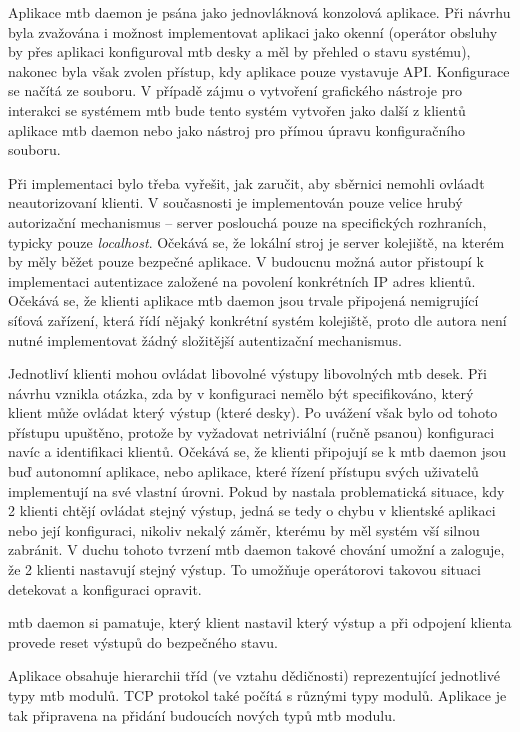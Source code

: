 Aplikace \gls{mtb} daemon je psána jako jednovláknová konzolová aplikace.
Při návrhu byla zvažována i možnost implementovat aplikaci jako okenní
(operátor obsluhy by přes aplikaci konfiguroval \gls{mtb} desky a měl by
přehled o stavu systému), nakonec byla však zvolen přístup, kdy aplikace pouze
vystavuje API. Konfigurace se načítá ze souboru. V případě zájmu o vytvoření
grafického nástroje pro interakci se systémem \gls{mtb} bude tento systém
vytvořen jako další z klientů aplikace \gls{mtb} daemon nebo jako nástroj pro
přímou úpravu konfiguračního souboru.

Při implementaci bylo třeba vyřešit, jak zaručit, aby sběrnici nemohli ovláadt
neautorizovaní klienti. V současnosti je implementován pouze velice hrubý
autorizační mechanismus – server poslouchá pouze na specifických rozhraních,
typicky pouze \textit{localhost}. Očekává se, že lokální stroj je server
kolejiště, na kterém by měly běžet pouze bezpečné aplikace. V budoucnu možná
autor přistoupí k implementaci autentizace založené na povolení konkrétních
IP adres klientů. Očekává se, že klienti aplikace \gls{mtb} daemon jsou trvale
připojená nemigrující síťová zařízení, která řídí nějaký konkrétní systém
kolejiště, proto dle autora není nutné implementovat žádný složitější
autentizační mechanismus.

Jednotliví klienti mohou ovládat libovolné výstupy libovolných \gls{mtb} desek.
Při návrhu vznikla otázka, zda by v konfiguraci nemělo být specifikováno,
který klient může ovládat který výstup (které desky). Po uvážení však bylo od
tohoto přístupu upuštěno, protože by vyžadovat netriviální (ručně psanou)
konfiguraci navíc a identifikaci klientů. Očekává se, že klienti připojují
se k \gls{mtb} daemon jsou buď autonomní aplikace, nebo aplikace, které řízení
přístupu svých uživatelů implementují na své vlastní úrovni. Pokud by nastala
problematická situace, kdy 2 klienti chtějí ovládat stejný výstup, jedná se
tedy o chybu v klientské aplikaci nebo její konfiguraci, nikoliv nekalý záměr,
kterému by měl systém vší silnou zabránit. V duchu tohoto tvrzení \gls{mtb} daemon
takové chování umožní a zaloguje, že 2 klienti nastavují stejný výstup. To
umožňuje operátorovi takovou situaci detekovat a konfiguraci opravit.

\gls{mtb} daemon si pamatuje, který klient nastavil který výstup a při odpojení
klienta provede reset výstupů do bezpečného stavu.

Aplikace obsahuje hierarchii tříd (ve vztahu dědičnosti) reprezentující
jednotlivé typy \gls{mtb} modulů. TCP protokol také počítá s různými typy
modulů. Aplikace je tak připravena na přidání budoucích nových typů \gls{mtb}
modulu.
